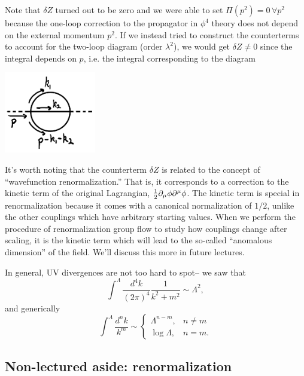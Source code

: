 Note that $\delta Z$ turned out to be zero and we were able to set $\Pi(p^2)=0 \,\forall p^2$ because the one-loop correction to the propagator in $\phi^4$ theory does not depend on the external momentum $p^2$. If we instead tried to construct the counterterms to account for the two-loop diagram (order $\lambda^2$), we would get $\delta Z\neq 0$ since the integral depends on $p$, i.e. the integral corresponding to the diagram
\begin{center}
    \includegraphics[width=0.3\textwidth]{2019/02/20190209_twolooprenorm.png}
\end{center}
It's worth noting that the counterterm $\delta Z$ is related to the concept of ``wavefunction renormalization.'' That is, it corresponds to a correction to the kinetic term of the original Lagrangian, $\frac{1}{2}\partial_\mu \phi \partial^\mu\phi$. The kinetic term is special in renormalization because it comes with a canonical normalization of $1/2$, unlike the other couplings which have arbitrary starting values. When we perform the procedure of renormalization group flow to study how couplings change after scaling, it is the kinetic term which will lead to the so-called ``anomalous dimension'' of the field. We'll discuss this more in future lectures.

In general, UV divergences are not too hard to spot-- we saw that
\begin{equation}
    \int^\Lambda \frac{d^4k}{(2\pi)^4} \frac{1}{k^2 +m^2} \sim \Lambda^2,
\end{equation}
and generically
\begin{equation}
    \int^\Lambda \frac{d^nk}{k^m}\sim \begin{cases}
        \Lambda^{n-m}, & n\neq m\\
        \log \Lambda, & n = m.
    \end{cases}
\end{equation}

\subsection*{Non-lectured aside: renormalization}

